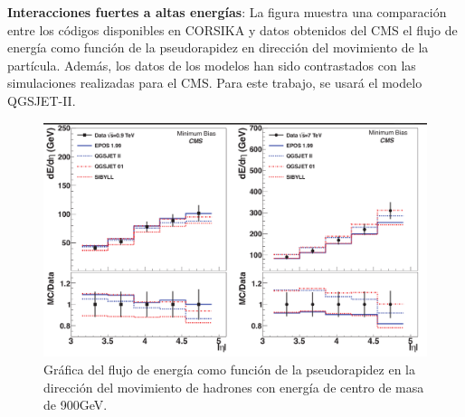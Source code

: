 \textbf{Interacciones fuertes a altas energías}: La figura muestra una comparación entre los códigos disponibles en CORSIKA y datos obtenidos del CMS el flujo de energía como función de la pseudorapidez en dirección del movimiento de la partícula. Además, los datos de los modelos han sido contrastados con las simulaciones realizadas para el CMS. Para este trabajo, se usará el modelo QGSJET-II.\\
\begin{figure}[htb!]
\centering
\includegraphics[width=1\textwidth]{images/Hadronic_Model_Comparison_3.png}
\caption[Flujo de energía para hadrones de alta energía]{Gráfica del flujo de energía como función de la pseudorapidez en la dirección del movimiento de hadrones con energía de centro de masa de 900GeV. \cite{Allen} }
        \label{fig:fig5}
\end{figure}